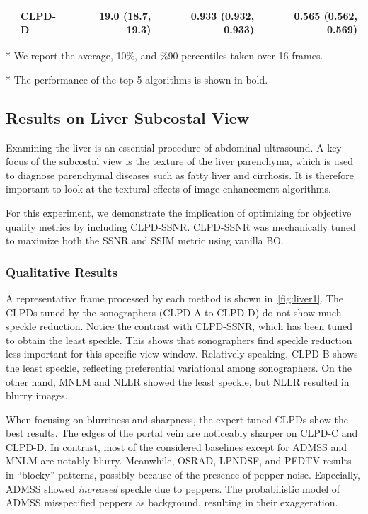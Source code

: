 \begin{table}
\begin{threeparttable}
\begin{tabular}{llrrr}
    & CLPD-D & 19.0 {\tiny(18.7, 19.3)} & \textbf{0.933 {\tiny(0.932, 0.933)}} &  \textbf{0.565 {\tiny(0.562, 0.569)}} \\\bottomrule
  \end{tabular}
  \begin{tablenotes}
    \item[*] We report the average, 10\%, and \%90 percentiles taken over 16 frames.
    \item[*] The performance of the top 5 algorithms is shown in bold.
  \end{tablenotes}
  \end{threeparttable}
  \vspace{-0.1in}
\end{table}
%
\subsection{Results on Liver Subcostal View}
Examining the liver is an essential procedure of abdominal ultrasound.
A key focus of the subcostal view is the texture of the liver parenchyma, which is used to diagnose parenchymal diseases such as fatty liver and cirrhosis.
It is therefore important to look at the textural effects of image enhancement algorithms.

For this experiment, we demonstrate the implication of optimizing for objective quality metrics by including CLPD-SSNR.
CLPD-SSNR was mechanically tuned to maximize both the SSNR and SSIM metric using vanilla BO.


%

\subsubsection{Qualitative Results}
A representative frame processed by each method is shown in~\cref{fig:liver1}.
The CLPDs tuned by the sonographers (CLPD-A to CLPD-D) do not show much speckle reduction.
Notice the contrast with CLPD-SSNR, which has been tuned to obtain the least speckle.
This shows that sonographers find speckle reduction less important for this specific view window.
Relatively speaking, CLPD-B shows the least speckle, reflecting preferential variational among sonographers.
On the other hand, MNLM and NLLR showed the least speckle, but NLLR resulted in blurry images.

When focusing on blurriness and sharpness, the expert-tuned CLPDs show the best results.
The edges of the portal vein are noticeably sharper on CLPD-C and CLPD-D.
In contrast, most of the considered baselines except for ADMSS and MNLM are notably blurry.
Meanwhile, OSRAD, LPNDSF, and PFDTV results in ``blocky'' patterns, possibly because of the presence of pepper noise. 
Especially, ADMSS showed \textit{increased} speckle due to peppers.
The probabilistic model of ADMSS misspecified peppers as background, resulting in their exaggeration.

